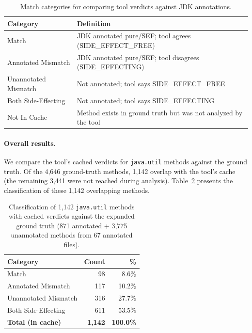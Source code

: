 \begin{table}[H]
\centering
\caption{Match categories for comparing tool verdicts against JDK annotations.}
\label{tab:categories}
\begin{tabular}{lp{8cm}}
\toprule
\textbf{Category} & \textbf{Definition} \\
\midrule
Match & JDK annotated pure/SEF; tool agrees (SIDE\_EFFECT\_FREE) \\
Annotated Mismatch & JDK annotated pure/SEF; tool disagrees (SIDE\_EFFECTING) \\
Unannotated Mismatch & Not annotated; tool says SIDE\_EFFECT\_FREE \\
Both Side-Effecting & Not annotated; tool says SIDE\_EFFECTING \\
Not In Cache & Method exists in ground truth but was not analyzed by the tool \\
\bottomrule
\end{tabular}
\end{table}




\paragraph{Overall results.}
We compare the tool's cached verdicts for \texttt{java.util} methods against the ground truth.
Of the 4,646 ground-truth methods, 1,142 overlap with the tool's cache (the remaining 3,441 were not reached during analysis).
Table~\ref{tab:results} presents the classification of these 1,142 overlapping methods.

\begin{table}[h]
\centering
\caption{Classification of 1,142 \texttt{java.util} methods with cached verdicts against the expanded ground truth (871 annotated + 3,775 unannotated methods from 67 annotated files).}
\label{tab:results}
\begin{tabular}{lrr}
\toprule
\textbf{Category} & \textbf{Count} & \textbf{\%} \\
\midrule
Match                 &    98 &  8.6\% \\
Annotated Mismatch    &   117 & 10.2\% \\
Unannotated Mismatch  &   316 & 27.7\% \\
Both Side-Effecting   &   611 & 53.5\% \\
\midrule
\textbf{Total (in cache)} & \textbf{1,142} & \textbf{100.0\%} \\
\bottomrule
\end{tabular}
\end{table}

